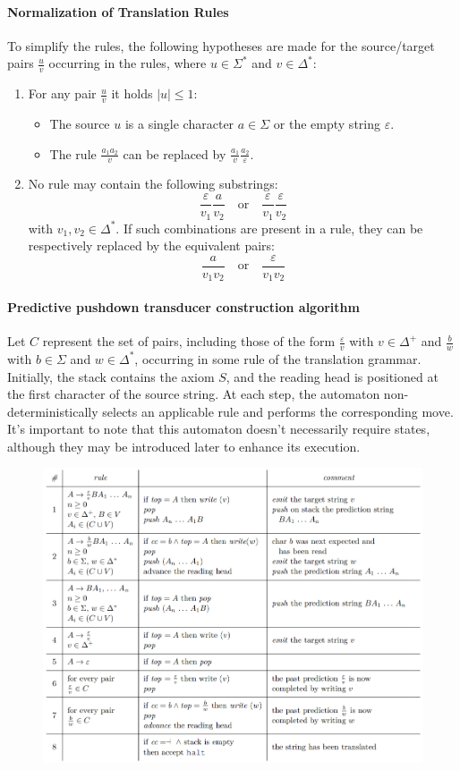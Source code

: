 \paragraph*{Normalization of Translation Rules}
To simplify the rules, the following hypotheses are made for the source/target pairs $\frac{u}{v}$ occurring in the rules, where $u \in \Sigma^{*}$ and $v \in \Delta^{*}$:
\begin{enumerate}
    \item For any pair $\frac{u}{v}$ it holds $|u| \leq 1$: 
        \begin{itemize}
            \item The source $u$ is a single character $a \in \Sigma$ or the empty string $\varepsilon$.
            \item The rule $\frac{a_1 a_2}{v}$ can be replaced by $\frac{a_1}{v}\frac{a_2}{\varepsilon}$.
        \end{itemize}
    \item No rule may contain the following substrings:
        \[ \dfrac{\varepsilon}{v_1} \dfrac{a}{v_2} \quad \text{or} \quad \dfrac{\varepsilon}{v_1} \dfrac{\varepsilon}{v_2} \]
        with $v_1, v_2 \in \Delta^{*}$. 
        If such combinations are present in a rule, they can be respectively replaced by the equivalent pairs: 
        \[ \dfrac{a}{v_1 v_2} \quad \text{or} \quad \dfrac{\varepsilon}{v_1 v_2} \]
\end{enumerate}

\paragraph*{Predictive pushdown transducer construction algorithm}
Let $C$ represent the set of pairs, including those of the form $\frac{\varepsilon}{v}$ with $v \in \Delta^+$ and $\frac{b}{w}$ with $b \in \Sigma$ and $w \in \Delta^{*}$, occurring in some rule of the translation grammar. 
Initially, the stack contains the axiom $S$, and the reading head is positioned at the first character of the source string. 
At each step, the automaton non-deterministically selects an applicable rule and performs the corresponding move. 
It's important to note that this automaton doesn't necessarily require states, although they may be introduced later to enhance its execution.
\begin{figure}[H]
  \centering
  \includegraphics[width=0.5\linewidth]{images/trans.png}
\end{figure}

